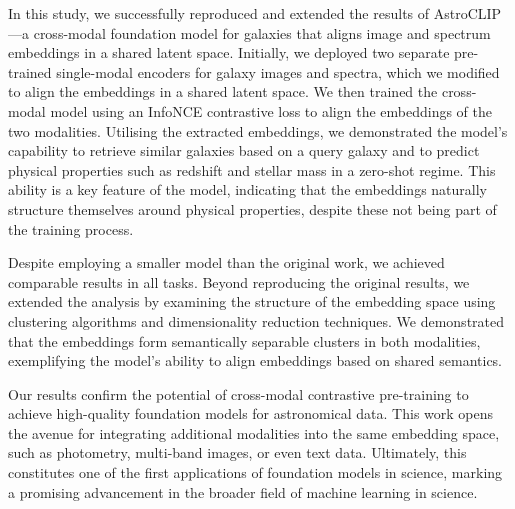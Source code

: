 \documentclass[a4paper,12pt]{article}
\begin{document}



In this study, we successfully reproduced and extended the results of AstroCLIP—a cross-modal foundation model for galaxies that aligns image and spectrum embeddings in a shared latent space. Initially, we deployed two separate pre-trained single-modal encoders for galaxy images and spectra, which we modified to align the embeddings in a shared latent space. We then trained the cross-modal model using an InfoNCE contrastive loss to align the embeddings of the two modalities. Utilising the extracted embeddings, we demonstrated the model's capability to retrieve similar galaxies based on a query galaxy and to predict physical properties such as redshift and stellar mass in a zero-shot regime. This ability is a key feature of the model, indicating that the embeddings naturally structure themselves around physical properties, despite these not being part of the training process.

Despite employing a smaller model than the original work, we achieved comparable results in all tasks. Beyond reproducing the original results, we extended the analysis by examining the structure of the embedding space using clustering algorithms and dimensionality reduction techniques. We demonstrated that the embeddings form semantically separable clusters in both modalities, exemplifying the model's ability to align embeddings based on shared semantics.

Our results confirm the potential of cross-modal contrastive pre-training to achieve high-quality foundation models for astronomical data. This work opens the avenue for integrating additional modalities into the same embedding space, such as photometry, multi-band images, or even text data. Ultimately, this constitutes one of the first applications of foundation models in science, marking a promising advancement in the broader field of machine learning in science.
\end{document}
